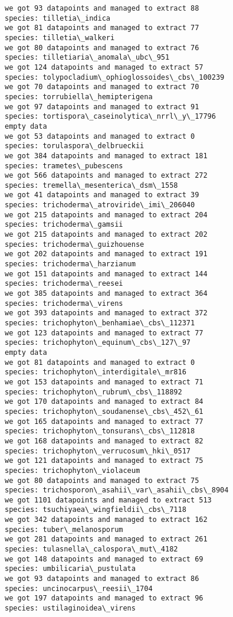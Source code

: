 \documentclass[11pt]{article}
\begin{document}
\begin{Verbatim}[commandchars=\\\{\}]
we got 93 datapoints and managed to extract 88
species: tilletia\_indica
we got 81 datapoints and managed to extract 77
species: tilletia\_walkeri
we got 80 datapoints and managed to extract 76
species: tilletiaria\_anomala\_ubc\_951
we got 124 datapoints and managed to extract 57
species: tolypocladium\_ophioglossoides\_cbs\_100239
we got 70 datapoints and managed to extract 70
species: torrubiella\_hemipterigena
we got 97 datapoints and managed to extract 91
species: tortispora\_caseinolytica\_nrrl\_y\_17796
empty data
we got 53 datapoints and managed to extract 0
species: torulaspora\_delbrueckii
we got 384 datapoints and managed to extract 181
species: trametes\_pubescens
we got 566 datapoints and managed to extract 272
species: tremella\_mesenterica\_dsm\_1558
we got 41 datapoints and managed to extract 39
species: trichoderma\_atroviride\_imi\_206040
we got 215 datapoints and managed to extract 204
species: trichoderma\_gamsii
we got 215 datapoints and managed to extract 202
species: trichoderma\_guizhouense
we got 202 datapoints and managed to extract 191
species: trichoderma\_harzianum
we got 151 datapoints and managed to extract 144
species: trichoderma\_reesei
we got 385 datapoints and managed to extract 364
species: trichoderma\_virens
we got 393 datapoints and managed to extract 372
species: trichophyton\_benhamiae\_cbs\_112371
we got 123 datapoints and managed to extract 77
species: trichophyton\_equinum\_cbs\_127\_97
empty data
we got 81 datapoints and managed to extract 0
species: trichophyton\_interdigitale\_mr816
we got 153 datapoints and managed to extract 71
species: trichophyton\_rubrum\_cbs\_118892
we got 170 datapoints and managed to extract 84
species: trichophyton\_soudanense\_cbs\_452\_61
we got 165 datapoints and managed to extract 77
species: trichophyton\_tonsurans\_cbs\_112818
we got 168 datapoints and managed to extract 82
species: trichophyton\_verrucosum\_hki\_0517
we got 121 datapoints and managed to extract 75
species: trichophyton\_violaceum
we got 80 datapoints and managed to extract 75
species: trichosporon\_asahii\_var\_asahii\_cbs\_8904
we got 1101 datapoints and managed to extract 513
species: tsuchiyaea\_wingfieldii\_cbs\_7118
we got 342 datapoints and managed to extract 162
species: tuber\_melanosporum
we got 281 datapoints and managed to extract 261
species: tulasnella\_calospora\_mut\_4182
we got 148 datapoints and managed to extract 69
species: umbilicaria\_pustulata
we got 93 datapoints and managed to extract 86
species: uncinocarpus\_reesii\_1704
we got 197 datapoints and managed to extract 96
species: ustilaginoidea\_virens

\end{Verbatim}
\end{document}
